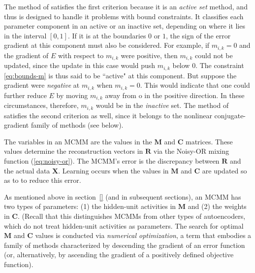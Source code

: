 The method of \citet{cheng-and-li:2012} satisfies the first criterion because it is an \emph{active set} method, and thus is designed to handle it problems with bound constraints. It classifies each parameter component in an active or an inactive set, depending on where it lies in the interval $[0,1]$. If it is at the boundaries $0$ or $1$, the sign of the error gradient at this component must also be considered. For example, if $m_{i,k} = 0$ and the gradient of $E$ with respect to $m_{i,k}$ were positive, then $m_{i,k}$ could not be updated, since the update in this case would push $m_{i,k}$ below $0$.  The constraint \eqref{eq:bounds-m} is thus said to be ``active" at this component. But suppose the gradient were \emph{negative} at $m_{i,k}$ when $m_{i,k} = 0$. This would indicate that one could further reduce $E$ by moving $m_{i,k}$ away from o in the positive direction. In these circumstances, therefore, $m_{i,k}$  would be in the \emph{inactive} set.
The method of \citet{cheng-and-li:2012} satisfies the second criterion as well, since it belongs to the nonlinear conjugate-gradient family of methods (see below).

The variables in an MCMM are the values in the $\mathbf{M}$ and $\mathbf{C}$ matrices. 
These values determine the 
reconstruction vectors in $\mathbf{R}$ via the Noisy-OR mixing function (\eqref{eq:noisy-or}). 
The MCMM's error is the discrepancy between  
$\mathbf{R}$ and the actual data $\mathbf{X}$. Learning occurs when the values in $\mathbf{M}$
and $\mathbf{C}$ are updated so as to to reduce this error. 
 
As mentioned above in section~\ref{} (and in subsequent sections), an MCMM has two types of parameters:
(1) the hidden-unit activities in $\textbf{M}$ and (2) the weights in $\textbf{C}$. (Recall that this 
distinguishes MCMMs from other types of autoencoders, which do not treat hidden-unit activities as parameters.  
The search for optimal $\textbf{M}$ and $\textbf{C}$ values is conducted
via %
\emph{numerical optimization}, a term that embodies a family of methods characterized by descending the gradient of an error function (or, alternatively, by ascending the gradient of a positively defined objective function). 

